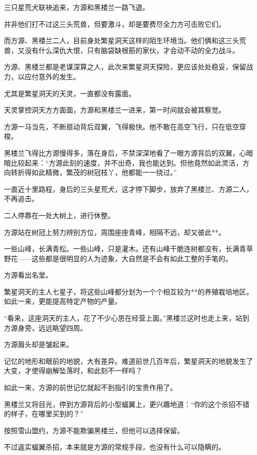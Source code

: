 
\begin{this_body}

三只星荒犬联袂追来，方源和黑楼兰一路飞退。

并非他们打不过这三头荒兽，但要激斗，却是要费尽全力方可击败它们。

而方源、黑楼兰二人，目前身处繁星洞天这样的陌生环境当。他们俩和这三头荒兽，又没有什么深仇大恨，只有脑袋缺根筋的家伙，才会动不动的全力战斗。

方源、黑楼兰都是老谋深算之人，此次来繁星洞天探险，更应该处处稳妥，保留战力，以应付意外的发生。

尤其是繁星洞天的天灵，一直都没有露面。

天灵掌控洞天方方面面，方源和黑楼兰一进来，第一时间就会被其察觉。

方源一马当先，不断扇动背后双翼，飞得极快。他不敢在高空飞行，只在低空穿梭。

黑楼兰飞得比方源慢得多，落在身后，不禁深深地看了一眼方源背后的双翼，心暗暗比较起来：“方源此刻的速度，并不出奇，我也能达到。但他竟然如此灵活，方向转折得如此精微，繁茂的树冠枝丫，他都能一一绕过。”

一直近十里路程，身后的三头星荒犬，这才停下脚步，放弃了黑楼兰、方源二人，不再追击。

二人停靠在一处大树上，进行休整。

方源站在树冠上努力辨别方位，周围座座青峰，相隔不远，却又彼此**。

一些山峰，长满青松。一些山峰，只是灌木。还有山峰干脆连树都没有，长满青草野花——这些都是很明显的人为迹象，大自然是不会有如此工整的手笔的。

方源看出名堂。

繁星洞天的主人七星子，将这些山峰都分划为一个个相互较为**的养殖栽培地区。如此一来，更能提高特定产物的产量。

“看来，这座洞天的主人，花了不少心思在经营上面。”黑楼兰这时也走上来，站到方源身旁，远远眺望四周。

方源眉头却是皱起来。

记忆的地形和眼前的地貌，大有差异。难道前世几百年后，繁星洞天的地貌发生了大变，才使得崩解坠落时，和此刻不一样吗？

如此一来，方源的前世记忆就起不到指引的宝贵作用了。

黑楼兰又将目光，停到方源背后的小型蝠翼上，更兴趣地道：“你的这个杀招不错的样子，在哪里买到的？”

按照雪山盟约，方源不能欺骗黑楼兰，但他可以选择保留。

不过返实蝠翼杀招，本来就是方源的常规手段，也没有什么可以隐瞒的。


\end{this_body}
